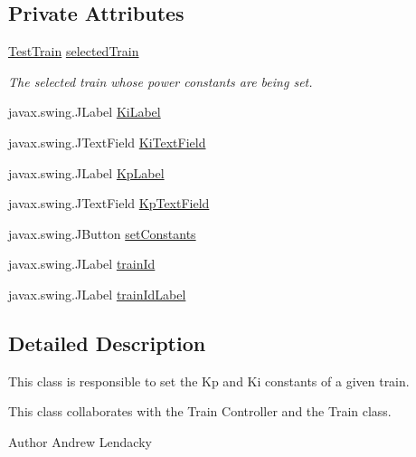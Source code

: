 \subsection*{Private Attributes}
\begin{DoxyCompactItemize}
\item 
\hyperlink{classTrainControllerComps_1_1TestTrain}{Test\+Train} \hyperlink{classTrainControllerComps_1_1TCEngineerPanel_a9950230a52e84c8ae3a3ebc577cfd016}{selected\+Train}
\begin{DoxyCompactList}\small\item\em The selected train whose power constants are being set. \end{DoxyCompactList}\item 
javax.\+swing.\+J\+Label \hyperlink{classTrainControllerComps_1_1TCEngineerPanel_ae0b00ead9378147b868dd7dd31fc0ec9}{Ki\+Label}
\item 
javax.\+swing.\+J\+Text\+Field \hyperlink{classTrainControllerComps_1_1TCEngineerPanel_a596fb9ed9f25ae8df3258652599bc3ca}{Ki\+Text\+Field}
\item 
javax.\+swing.\+J\+Label \hyperlink{classTrainControllerComps_1_1TCEngineerPanel_ab5cf30e22a542ee80bb725bdfca12df5}{Kp\+Label}
\item 
javax.\+swing.\+J\+Text\+Field \hyperlink{classTrainControllerComps_1_1TCEngineerPanel_a148b0b39f6a7c2aa6900223f2e586401}{Kp\+Text\+Field}
\item 
javax.\+swing.\+J\+Button \hyperlink{classTrainControllerComps_1_1TCEngineerPanel_a582de20717b9c5095c70421027e0b25b}{set\+Constants}
\item 
javax.\+swing.\+J\+Label \hyperlink{classTrainControllerComps_1_1TCEngineerPanel_a62a6ac9c5ed190fc132747fe8a3d9500}{train\+Id}
\item 
javax.\+swing.\+J\+Label \hyperlink{classTrainControllerComps_1_1TCEngineerPanel_a674c21e174fcd06d302dcc3ae23e1722}{train\+Id\+Label}
\end{DoxyCompactItemize}


\subsection{Detailed Description}
This class is responsible to set the Kp and Ki constants of a given train. 

This class collaborates with the Train Controller and the Train class.

\begin{DoxyAuthor}{Author}
Andrew Lendacky 
\end{DoxyAuthor}


